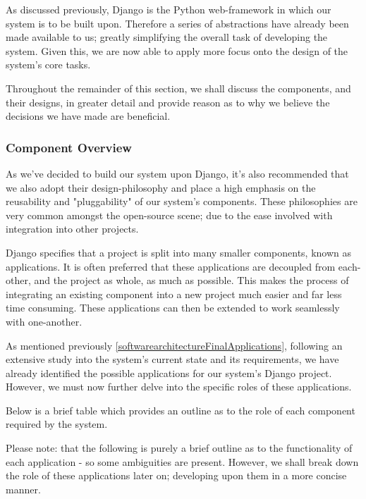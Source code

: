 		As discussed previously, Django is the Python web-framework in which our system is to be built upon. Therefore a series of abstractions have already been made available to us; greatly simplifying the overall task of developing the system. Given this, we are now able to apply more focus onto the design of the system's core tasks.
		
		Throughout the remainder of this section, we shall discuss the components, and their designs, in greater detail and provide reason as to why we believe the decisions we have made are beneficial.
	
	\subsubsection*{Component Overview}
		As we've decided to build our system upon Django, it's also recommended that we also adopt their design-philosophy and place a high emphasis on the reusability and "pluggability" of our system's components. These philosophies are very common amongst the open-source scene; due to the ease involved with integration into other projects.
		
		Django specifies that a project is split into many smaller components, known as applications. It is often preferred that these applications are decoupled from each-other, and the project as whole, as much as possible. This makes the process of integrating an existing component into a new project much easier and far less time consuming. These applications can then be extended to work seamlessly with one-another.
		
		As mentioned previously \ref{softwarearchitectureFinalApplications}, following an extensive study into the system's current state and its requirements, we have already identified the possible applications for our system's Django project. However, we must now further delve into the specific roles of these applications.
		
		Below is a brief table which provides an outline as to the role of each component required by the system.
		
		Please note: that the following is purely a brief outline as to the functionality of each application - so some ambiguities are present.
		However, we shall break down the role of these applications later on; developing upon them in a more concise manner.
		
